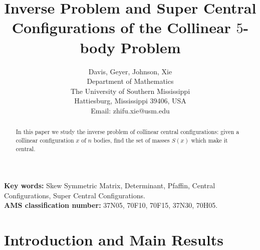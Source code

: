 \documentclass[11pt,leqno]{article}
\theoremstyle{definition}
\theoremstyle{remark}
\numberwithin{equation}{section}
\begin{document}
\title{Inverse Problem and Super Central Configurations of the Collinear $5$-body Problem }
\author{Davis, Geyer, Johnson, Xie  \\
Department of Mathematics\\
The University of Southern Mississippi\\
Hattiesburg, Mississippi 39406, USA\\
 Email: zhifu.xie@usm.edu }
\date{}

\maketitle
\begin{abstract}
 In this paper we study the inverse problem of collinear central configurations: given a collinear configuration $x$ of $n$ bodies, find the set of masses $S(x)$ which make it central. %
\end{abstract}

{\bf Key words:} Skew Symmetric Matrix, Determinant, Pfaffin, Central Configurations, Super Central Configurations. \\
{\bf AMS classification number:} 37N05, 70F10, 70F15,
37N30, 70H05.\\

\section{Introduction and Main Results}
\setcounter{section}{1} \setcounter{equation}{0}
\end{document}
